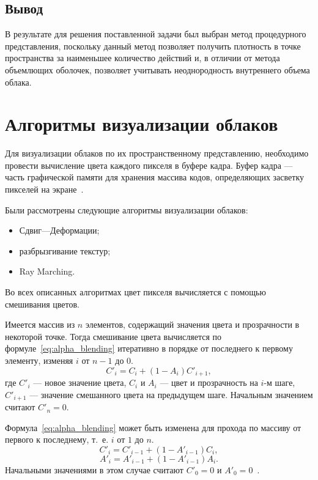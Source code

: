 \subsection*{Вывод}
В результате для решения поставленной задачи был выбран метод процедурного представления, поскольку данный метод позволяет получить плотность в точке пространства за наименьшее количество действий и, в отличии от метода объемлющих оболочек, позволяет учитывать неоднородность внутреннего объема облака.


\section{Алгоритмы визуализации облаков}

Для визуализации облаков по их пространственному представлению, необходимо провести вычисление цвета каждого пикселя в буфере кадра. 
Буфер кадра --- часть графической памяти для хранения массива кодов, определяющих засветку пикселей на экране~\cite{framebuffer}. 

Были рассмотрены следующие алгоритмы визуализации облаков:
\begin{itemize}
	\item Сдвиг---Деформации;
	\item разбрызгивание текстур;
	\item Ray Marching.
\end{itemize}

Во всех описанных алгоритмах цвет пикселя вычисляется с помощью смешивания цветов. 

Имеется массив из $n$ элементов, содержащий значения цвета и прозрачности в некоторой точке. Тогда смешивание цвета вычисляется по формуле~\eqref{eq:alpha_blending} итеративно в порядке от последнего к первому элементу, изменяя $i$ от $n-1$ до $0$.
\begin{equation}
	\label{eq:alpha_blending}
	C'_i = C_i + (1 - A_i)C'_{i+1},
\end{equation}
где $C'_i$ --- новое значение цвета, $C_i$ и $A_i$ --- цвет и прозрачность на $i$-м шаге, $C'_{i+1}$ --- значение смешанного цвета на предыдущем шаге. Начальным значением считают $C'_n = 0$.

Формула~\eqref{eq:alpha_blending} может быть изменена для прохода по массиву от первого к последнему, т.~е. $i$ от $1$ до $n$.
\begin{equation}
	\label{eq:color_blending_for}
	C'_i = C'_{i - 1} + (1 - A'_{i - 1})C_{i},
\end{equation}
\begin{equation}
	\label{eq:alpha_blending_for}
	A'_i = A'_{i - 1} + (1 - A'_{i - 1})A_{i}.
\end{equation}
Начальными значениями в этом случае считают $C'_0 = 0$ и $A'_0=0$~\cite{rtvg}.



